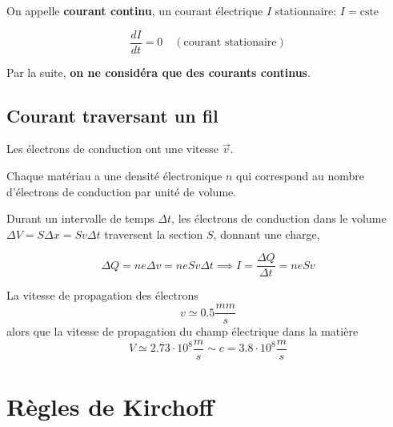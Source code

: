 \documentclass[
    11pt,
    a4paper,
    oneside,
    headinlcude, footinclude,
    twoside,
]{report}
\renewcommand{\vec}[1]{\overrightarrow{#1}}
\begin{document}
On appelle \textbf{courant continu}, un courant électrique $I$ stationnaire: $I
= \text{cste}$

\begin{equation}
    \label{eq:8.2}
    \frac{dI}{dt} = 0 \quad (\text{courant stationaire}) 
\end{equation}

Par la suite, \textbf{on ne considéra que des courants continus}.

\subsection{Courant traversant un fil}
\label{sub:courant_traversant_un_fil}

\begin{center}
    \begin{minipage}{.5\linewidth}
        \setlength{\parskip}{.3em}
        Les électrons de conduction ont une vitesse $\vec v$.

        Chaque matériau a une densité électronique $n$ qui correspond au
        nombre d'électrons de conduction par unité de volume.

    \end{minipage}
    \begin{minipage}{.49\linewidth}
    \end{minipage}
\end{center}

Durant un intervalle de temps $\Delta t$, les électrons de conduction dans le
volume $\Delta V = S \Delta x = Sv \Delta t$ traversent la section $S$, donnant
une charge,

\begin{equation}
    \label{eq:8.3}
    \Delta Q = n e \Delta v = n e S v \Delta t \implies I = \frac{\Delta Q}{
    \Delta t } = n e S v
\end{equation}

La vitesse de propagation des électrons $$v \simeq 0.5 \frac{mm}{s}$$  alors que
la vitesse de propagation du champ électrique dans la matière 
\begin{equation}
    \label{eq:8.4}
    V \simeq 2.73 \cdot 10^8 \frac{m}{s} \sim c = 3.8 \cdot 10^{8} \frac{m}{s}
\end{equation}


\section{Règles de Kirchoff}
\label{sec:regles_de_kirchoff}
\end{document}
